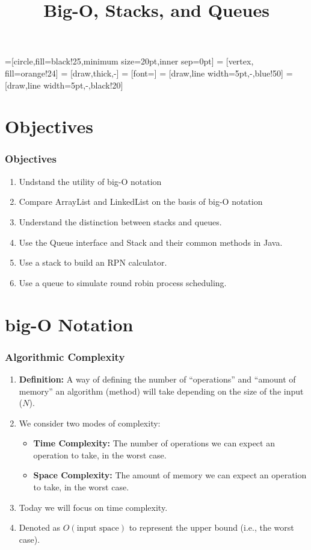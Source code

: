 \documentclass{beamer}
\title{\textbf{Big-O, Stacks, and Queues}}
\date{}
\begin{document}
=[circle,fill=black!25,minimum size=20pt,inner sep=0pt]
 = [vertex, fill=orange!24]
 = [draw,thick,-]
 = [font=\small]
 = [draw,line width=5pt,-,blue!50]
 = [draw,line width=5pt,-,black!20]


\frame{\titlepage}

\section{Objectives}
\begin{frame}
    \frametitle{Objectives}
    \begin{enumerate}
        \item Undstand the utility of big-O notation
        \item Compare ArrayList and LinkedList on the basis of big-O notation
        \item Understand the distinction between stacks and queues.
        \item Use the Queue interface and Stack and their common methods in Java. 
        \item Use a stack to build an RPN calculator.
        \item Use a queue to simulate round robin process scheduling.
    \end{enumerate}
\end{frame}

\section{big-O Notation}

\begin{frame}
    \frametitle{Algorithmic Complexity}
    \begin{enumerate}
        \item \textbf{Definition:} A way of defining the number of ``operations'' and ``amount of memory'' an algorithm (method) will take depending on the size of the input ($N$).
            \pause
        \item We consider two modes of complexity:
        \begin{itemize}
            \item \textbf{Time Complexity:} The number of operations we can expect an operation to take, in the worst case.
            \item \textbf{Space Complexity:} The amount of memory we can expect an operation to take, in the worst case.
        \end{itemize}
        \pause
        \item Today we will focus on time complexity.
        \pause
        \item Denoted as $O(\text{input space})$ to represent the upper bound (i.e., the worst case).
    \end{enumerate}
\end{frame}
\end{document}
